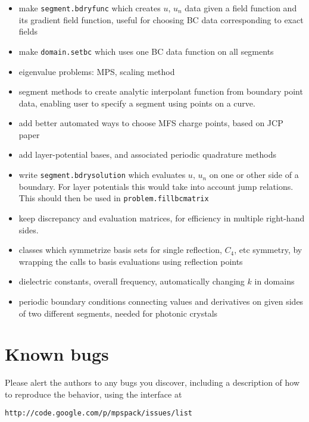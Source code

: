 \documentclass[12pt]{article}
\newcommand{\bi}{\begin{itemize}}
\newcommand{\ei}{\end{itemize}}
\begin{document}
\bi
\item make {\tt segment.bdryfunc} which creates $u$, $u_n$ data given a
field function and its gradient field function, useful for choosing BC
data corresponding to exact fields
\item make {\tt domain.setbc} which uses one BC data function on all segments
\item eigenvalue problems: MPS, scaling method
\item segment methods to create analytic interpolant function from boundary
point data, enabling user to specify a segment using points on a curve.
\item add better automated ways to choose MFS charge points, based on JCP paper
\item add layer-potential bases, and associated periodic quadrature methods
\item write {\tt segment.bdrysolution} which evaluates $u$, $u_n$ on one
or other side of a boundary. For layer potentials this would take into account
jump relations. This should then be used in {\tt problem.fillbcmatrix}
\item keep discrepancy and evaluation matrices, for efficiency in multiple
right-hand sides.
\item classes which symmetrize basis sets for single reflection, $C_4$, etc
symmetry, by wrapping the calls to basis evaluations using reflection
points
\item dielectric constants, overall frequency,
automatically changing $k$ in domains
\item periodic boundary conditions connecting values and derivatives
on given sides of two different segments, needed for photonic crystals
\ei

\section{Known bugs}

Please alert the authors to any bugs you discover, including a description
of how to reproduce the behavior, using the interface at

{\tt http://code.google.com/p/mpspack/issues/list}

 

\end{document}
